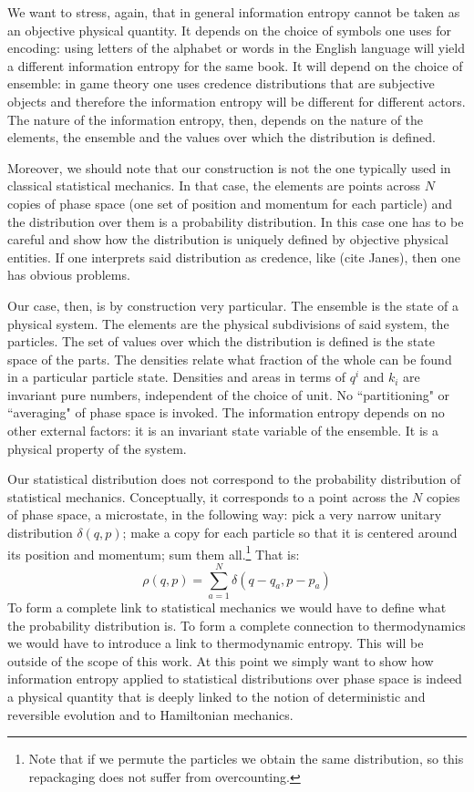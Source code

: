 \documentclass[11pt]{elsarticle}
\begin{document}
We want to stress, again, that in general information entropy cannot be taken as an objective physical quantity. It depends on the choice of symbols one uses for encoding: using letters of the alphabet or words in the English language will yield a different information entropy for the same book. It will depend on the choice of ensemble: in game theory one uses credence distributions that are subjective objects and therefore the information entropy will be different for different actors. The nature of the information entropy, then, depends on the nature of the elements, the ensemble and the values over which the distribution is defined.

Moreover, we should note that our construction is not the one typically used in classical statistical mechanics. In that case, the elements are points across $N$ copies of phase space (one set of position and momentum for each particle) and the distribution over them is a probability distribution. In this case one has to be careful and show how the distribution is uniquely defined by objective physical entities. If one interprets said distribution as credence, like (cite Janes), then one has obvious problems.

Our case, then, is by construction very particular. The ensemble is the state of a physical system. The elements are the physical subdivisions of said system, the particles. The set of values over which the distribution is defined is the state space of the parts. The densities relate what fraction of the whole can be found in a particular particle state. Densities and areas in terms of $q^i$ and $k_i$ are invariant pure numbers, independent of the choice of unit. No ``partitioning" or ``averaging" of phase space is invoked. The information entropy depends on no other external factors: it is an invariant state variable of the ensemble. It is a physical property of the system.

Our statistical distribution does not correspond to the probability distribution of statistical mechanics. Conceptually, it corresponds to a point across the $N$ copies of phase space, a microstate, in the following way: pick a very narrow unitary distribution $\delta(q,p)$; make a copy for each particle so that it is centered around its position and momentum; sum them all.\footnote{Note that if we permute the particles we obtain the same distribution, so this repackaging does not suffer from overcounting.} That is:
\begin{equation}
\rho(q,p) = \sum\limits_{a=1}^N \delta(q - q_a, p - p_a)
\end{equation}
To form a complete link to statistical mechanics we would have to define what the probability distribution is. To form a complete connection to thermodynamics we would have to introduce a link to thermodynamic entropy. This will be outside of the scope of this work. At this point we simply want to show how information entropy applied to statistical distributions over phase space is indeed a physical quantity that is deeply linked to the notion of deterministic and reversible evolution and to Hamiltonian mechanics.
\end{document}
